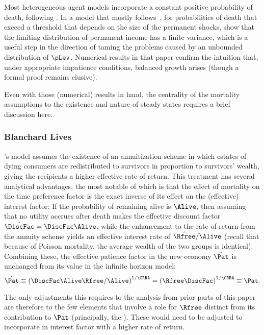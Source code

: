 \documentclass[BufferStockTheory]{subfiles}
\begin{document}
Most heterogeneous agent models incorporate a constant positive probability of death, following \cite{blanchardFinite}.  In a model that mostly follows~\cite{blanchardFinite}, for probabilities of death that exceed a threshold that depends on the size of the permanent shocks, \cite{cstwMPC} show that the limiting distribution of permanent income has a finite variance, which is a useful step in the direction of taming the problems caused by an unbounded distribution of $\pLev$.  Numerical results in that paper confirm the intuition that, under appropriate impatience conditions, balanced growth arises (though a formal proof remains elusive).

Even with those (numerical) results in hand, the centrality of the mortality assumptions to the existence and nature of steady states requires a brief discussion here.

\hypertarget{Blanchard-Lives}{}
\subsubsection{Blanchard Lives}

\cite{blanchardFinite}'s model assumes the existence of an annuitization scheme in which estates of dying consumers are redistributed to survivors in proportion to survivors' wealth, giving the recipients a higher effective rate of return. This treatment has several analytical advantages, the most notable of which is that the effect of mortality on the time preference factor is the exact inverse of its effect on the (effective) interest factor:  If the probability of remaining alive is $\Alive$, then assuming that no utility accrues after death makes the effective discount factor $\hat{\DiscFac}=\DiscFac\Alive$, while the enhancement to the rate of return from the annuity scheme yields an effective interest rate of $\hat{\Rfree}/\Alive$ (recall that because of Poisson mortality, the average wealth of the two groups is identical).  Combining these, the effective patience factor in the new economy $\hat{\Pat}$ is unchanged from its value in the infinite horizon model:
\begin{equation}
  \hat{\Pat} \equiv \left(\DiscFac \Alive \Rfree / \Alive\right)^{1/\CRRA} = \left(\Rfree \DiscFac\right)^{1/\CRRA} \equiv \Pat.
\end{equation}

The only adjustments this requires to the analysis from prior parts of this paper are therefore to the few elements that involve a role for $\Rfree$ distinct from its contribution to $\Pat$ (principally, the {\RIC}).  These would need to be adjusted to incorporate in interest factor with a higher rate of return.  %
\end{document}
